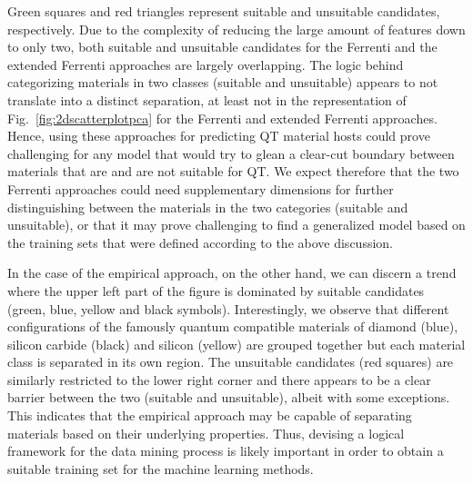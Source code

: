 \documentclass[superscriptaddress,unsortedaddress,
 amsmath,amssymb,
 aps,
]{revtex4-2}
\begin{document}
Green squares and red triangles represent suitable and unsuitable candidates, respectively. Due to the complexity of reducing the large amount of features down to only two, both suitable and unsuitable candidates for the Ferrenti and the extended Ferrenti approaches are largely overlapping. 
The logic behind categorizing materials in two classes (suitable and unsuitable) appears to not translate into a distinct separation, at least not in the representation of  Fig.~\ref{fig:2dscatterplotpca} for the Ferrenti and extended Ferrenti approaches.  
Hence, using these approaches for predicting QT material hosts could prove challenging for any model that would try to glean a clear-cut boundary between materials that are and are not suitable for QT. 
We expect therefore that the two Ferrenti approaches could need supplementary dimensions for further distinguishing between the materials in the two categories (suitable and unsuitable), or that it may prove challenging to find a generalized model based on the training sets that were defined according to the above discussion. 

In the case of the empirical approach, on the other hand, we can discern a trend where the upper left part of the figure is dominated by suitable candidates (green, blue, yellow and black symbols). 
Interestingly, we observe that different configurations of the famously quantum compatible materials of diamond (blue), silicon carbide (black) and silicon (yellow) are grouped together but each material class is separated in its own region. 
The unsuitable candidates (red squares) are similarly restricted to the lower right corner and there appears to be a clear barrier between the two (suitable and unsuitable), albeit with some exceptions. This indicates that the empirical approach may be capable of separating materials based on their underlying properties. Thus, devising a logical framework for the data mining process is likely important in order to obtain a suitable training set for the machine learning methods. 
\end{document}
